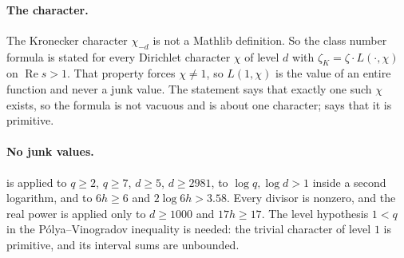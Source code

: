 \documentclass[11pt]{article}
\theoremstyle{definition}
\newcommand{\re}{\operatorname{Re}}
\begin{document}
\paragraph{The character.} The Kronecker character $\chi_{-d}$ is not a Mathlib definition. So the class number formula is stated for every Dirichlet character $\chi$ of level $d$ with $\zeta_K = \zeta\cdot L(\cdot,\chi)$ on $\re s > 1$. That property forces $\chi \ne 1$, so $L(1,\chi)$ is the value of an entire function and never a junk value. The statement  says that exactly one such $\chi$ exists, so the formula is not vacuous and is about one character;  says that it is primitive.

\paragraph{No junk values.}  is applied to $q \ge 2$, $q \ge 7$, $d \ge 5$, $d \ge 2981$, to $\log q, \log d > 1$ inside a second logarithm, and to $6h \ge 6$ and $2\log 6h > 3.58$. Every divisor is nonzero, and the real power is applied only to $d \ge 1000$ and $17h \ge 17$. The level hypothesis $1 < q$ in the Pólya--Vinogradov inequality is needed: the trivial character of level $1$ is primitive, and its interval sums are unbounded.
\end{document}
